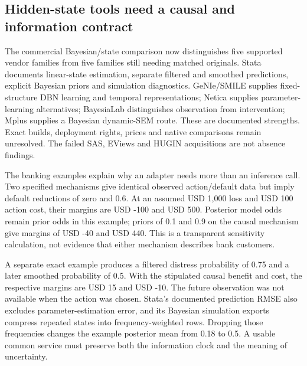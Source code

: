 \hypertarget{hidden-state-tools-need-a-causal-and-information-contract}{%
\subsection{Hidden-state tools need a causal and information
contract}\label{hidden-state-tools-need-a-causal-and-information-contract}}

The commercial Bayesian/state comparison now distinguishes five
supported vendor families from five families still needing matched
originals. Stata documents linear-state estimation, separate filtered
and smoothed predictions, explicit Bayesian priors and simulation
diagnostics. GeNIe/SMILE supplies fixed-structure DBN learning and
temporal representations; Netica supplies parameter-learning
alternatives; BayesiaLab distinguishes observation from intervention;
Mplus supplies a Bayesian dynamic-SEM route. These are documented
strengths. Exact builds, deployment rights, prices and native
comparisons remain unresolved. The failed SAS, EViews and HUGIN
acquisitions are not absence findings.
\citep{exec22_state_stata_sspace,exec22_state_stata_sspace_post,
exec22_state_stata_bayesmh,exec13_ct_genie_dbn,exec13_ct_genie_learning,
exec13_ct_smile_tutorial,exec13_latent_netica_algorithms,
exec13_ct_bayesia_inference,exec13_ct_bayesia_identification,exec13_ct_mplus81}

The banking examples explain why an adapter needs more than an inference
call. Two specified mechanisms give identical observed action/default
data but imply default reductions of zero and 0.6. At an assumed USD
1,000 loss and USD 100 action cost, their margins are USD -100 and USD
500. Posterior model odds remain prior odds in this example; priors of
0.1 and 0.9 on the causal mechanism give margins of USD -40 and USD 440.
This is a transparent sensitivity calculation, not evidence that either
mechanism describes bank customers. \citep{exec22_state_reference}

A separate exact example produces a filtered distress probability of
0.75 and a later smoothed probability of 0.5. With the stipulated causal
benefit and cost, the respective margins are USD 15 and USD -10. The
future observation was not available when the action was chosen. Stata's
documented prediction RMSE also excludes parameter-estimation error, and
its Bayesian simulation exports compress repeated states into
frequency-weighted rows. Dropping those frequencies changes the example
posterior mean from 0.18 to 0.5. A usable common service must preserve
both the information clock and the meaning of uncertainty.
\citep{exec22_state_stata_sspace_post,exec22_state_stata_bayesmh,
exec22_state_reference}

